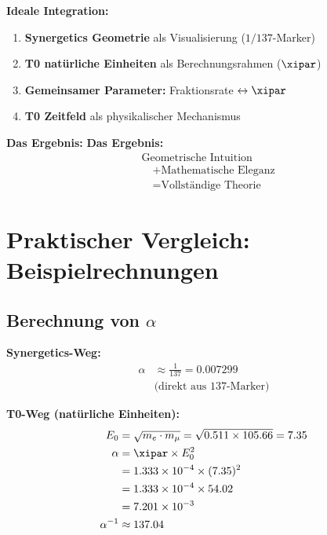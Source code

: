 	\begin{gemeinsam}
		\textbf{Ideale Integration:}
		
		\begin{enumerate}
			\item \textbf{Synergetics Geometrie} als Visualisierung ($1/137$-Marker)
			\item \textbf{T0 natürliche Einheiten} als Berechnungsrahmen ($\xipar$)
			\item \textbf{Gemeinsamer Parameter:} Fraktionsrate $\leftrightarrow \xipar$
			\item \textbf{T0 Zeitfeld} als physikalischer Mechanismus
		\end{enumerate}
		
		\textbf{Das Ergebnis:}
\textbf{Das Ergebnis:}
\begin{equation}
	\boxed{
		\begin{aligned}
			&\text{Geometrische Intuition} \\
			&\quad + \text{Mathematische Eleganz} \\
			&\quad = \text{Vollständige Theorie}
		\end{aligned}
	}
\end{equation}
	\end{gemeinsam}
	
	\section{Praktischer Vergleich: Beispielrechnungen}
	
	\subsection{Berechnung von $\alpha$}
	
	\textbf{Synergetics-Weg:}
	\begin{align}
		\alpha &\approx \frac{1}{137} = 0.007299 \\
		&\text{(direkt aus 137-Marker)}
	\end{align}
	
	\textbf{T0-Weg (natürliche Einheiten):}
	\begin{align}
		E_0 &= \sqrt{m_e \cdot m_\mu} = \sqrt{0.511 \times 105.66} = 7.35 \\
		\alpha &= \xipar \times E_0^2 \\
		&= 1.333 \times 10^{-4} \times (7.35)^2 \\
		&= 1.333 \times 10^{-4} \times 54.02 \\
		&= 7.201 \times 10^{-3} \\
		\alpha^{-1} &\approx 137.04
	\end{align}
	
